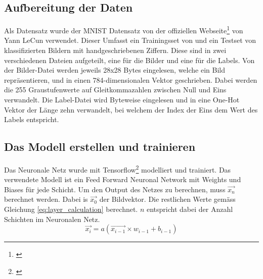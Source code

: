 \documentclass[Interploate_hadwritten_Digits.tex]{subfiles}
\begin{document}
	\subsection{Aufbereitung der Daten}
	Als Datensatz wurde der MNIST Datensatz von der offiziellen Webseite\footnote{\cite{lecun-mnist}} von Yann LeCun verwendet. Dieser Umfasst ein Trainingsset von  und ein Testset von  klassifizierten Bildern mit handgeschriebenen Ziffern. Diese sind in zwei verschiedenen Dateien aufgeteilt, eine für die Bilder und eine für die Labels. Von der Bilder-Datei werden jeweils 28x28 Bytes eingelesen, welche ein Bild repräsentieren, und in einen 784-dimensionalen Vektor geschrieben. Dabei werden die 255 Graustufenwerte auf Gleitkommazahlen zwischen Null und Eins verwandelt. Die Label-Datei wird Byteweise eingelesen und in eine One-Hot Vektor der Länge zehn verwandelt, bei welchem der Index der Eins dem Wert des Labels entspricht.
	
	\subsection{Das Modell erstellen und trainieren}
	Das Neuronale Netz wurde mit Tensorflow\footnote{\cite{tensorflow}} modelliert und trainiert. Das verwendete Modell ist ein Feed Forward Neuronal Network mit Weights und Biases für jede Schicht. Um den Output des Netzes zu berechnen, muss $ \vec{x_{n}} $ berechnet werden. Dabei is $ \vec{x_{0}} $ der Bildvektor. Die restlichen Werte gemäss Gleichung \ref{eq:layer_calculation} berechnet. $ n $ entspricht dabei der Anzahl Schichten im Neuronalen Netz.
	\begin{equation}
	\vec{x_{i}} = a(\vec{x_{i-1}} \times w_{i-1} + b_{i-1})
	\label{eq:layer_calculation}
	\end{equation}
	
\end{document}
